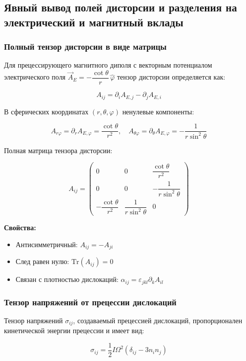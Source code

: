 \documentclass[12pt]{article}
\begin{document}
\subsection{Явный вывод полей дисторсии и разделения на электрический и магнитный вклады}

\subsubsection{Полный тензор дисторсии в виде матрицы}

Для прецессирующего магнитного диполя с векторным потенциалом электрического поля $\vec{A}_E = -\dfrac{\cot\theta}{r} \, \hat{\varphi}$ тензор дисторсии определяется как:

\[
A_{ij} = \partial_i A_{E,j} - \partial_j A_{E,i}
\]

В сферических координатах $(r, \theta, \varphi)$ ненулевые компоненты:

\[
A_{r\varphi} = \partial_r A_{E,\varphi} = \frac{\cot\theta}{r^2}, \quad A_{\theta\varphi} = \partial_\theta A_{E,\varphi} = -\frac{1}{r \sin^2\theta}
\]

Полная матрица тензора дисторсии:

\[
A_{ij} = \begin{pmatrix}
0 & 0 & \dfrac{\cot\theta}{r^2} \\
0 & 0 & -\dfrac{1}{r \sin^2\theta} \\
-\dfrac{\cot\theta}{r^2} & \dfrac{1}{r \sin^2\theta} & 0
\end{pmatrix}
\]

\textbf{Свойства:}
\begin{itemize}
\item Антисимметричный: $A_{ij} = -A_{ji}$
\item След равен нулю: $\text{Tr}(A_{ij}) = 0$
\item Связан с плотностью дислокаций: $\alpha_{ij} = \varepsilon_{jkl} \partial_k A_{il}$
\end{itemize}

\subsubsection{Тензор напряжений от прецессии дислокаций}

Тензор напряжений $\sigma_{ij}$, создаваемый прецессией дислокаций, пропорционален кинетической энергии прецессии и имеет вид:

\[
\sigma_{ij} = \frac{1}{2} I \Omega^2 \left( \delta_{ij} - 3 n_i n_j \right)
\]
\end{document}
